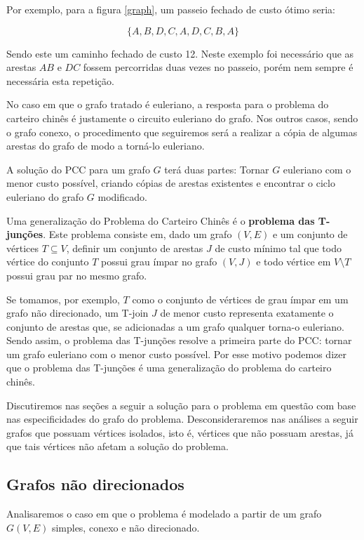 Por exemplo, para a figura \ref{graph}, um passeio fechado de custo ótimo seria: 

\[ \{A, B, D, C, A, D, C, B, A\} \] 

Sendo este um caminho fechado de custo 12.
Neste exemplo foi necessário que as arestas $AB$ e $DC$ fossem percorridas duas vezes no passeio, porém nem sempre é necessária esta repetição.

No caso em que o grafo tratado é euleriano, a resposta para o problema do carteiro chinês é justamente o circuito euleriano do grafo.
Nos outros casos, sendo o grafo conexo, o procedimento que seguiremos será a realizar a cópia de algumas arestas do grafo de modo a torná-lo euleriano.

A solução do PCC para um grafo $G$ terá duas partes: Tornar $G$ euleriano com o menor custo possível, criando cópias de arestas existentes e encontrar o ciclo euleriano do grafo $G$ modificado.

Uma generalização do Problema do Carteiro Chinês é o \textbf{problema das T-junções}.
Este problema consiste em, dado um grafo $(V, E)$ e um conjunto de vértices $T \subseteq V$, definir um conjunto de arestas $J$ de custo mínimo tal que todo vértice do conjunto $T$ possui grau ímpar no grafo $(V, J)$ e todo vértice em $V \setminus T$ possui grau par no mesmo grafo.

Se tomamos, por exemplo, $T$ como o conjunto de vértices de grau ímpar em um grafo não direcionado, um T-join $J$ de menor custo representa exatamente o conjunto de arestas que, se adicionadas a um grafo qualquer torna-o euleriano.
Sendo assim, o problema das T-junções resolve a primeira parte do PCC: tornar um grafo euleriano com o menor custo possível. 
Por esse motivo podemos dizer que o problema das T-junções é uma generalização do problema do carteiro chinês.

Discutiremos nas seções a seguir a solução para o problema em questão com base nas especificidades do grafo do problema. 
Desconsideraremos nas análises a seguir grafos que possuam vértices isolados, isto é, vértices que não possuam arestas, já que tais vértices não afetam a solução do problema.

\subsection{Grafos não direcionados}
        \label{sec:pcc}

Analisaremos o caso em que o problema é modelado a partir de um grafo $G(V, E)$ simples, conexo e não direcionado.

